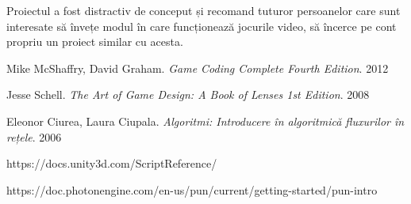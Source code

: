 \documentclass[12pt, a4paper]{article}
\begin{document}
	Proiectul a fost distractiv de conceput și recomand tuturor persoanelor care sunt interesate să învețe modul în care funcționează jocurile video, să încerce pe cont propriu un proiect similar cu acesta.
	
	
	
	\pagebreak
	\begin{thebibliography}{3}
		Mike McShaffry, David Graham. \newline
		\textit{Game Coding Complete Fourth Edition}. 2012
		
		Jesse Schell.  \newline
		\textit{The Art of Game Design: A Book of Lenses 1st Edition}. 2008
		
		Eleonor Ciurea, Laura Ciupala.  \newline
		\textit{Algoritmi: Introducere în algoritmică fluxurilor în rețele}. 2006
		
		https://docs.unity3d.com/ScriptReference/
		
		https://doc.photonengine.com/en-us/pun/current/getting-started/pun-intro
		
	\end{thebibliography}
	
	
\end{document}
